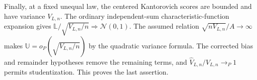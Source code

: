 Finally, at a fixed unequal law, the centered Kantorovich scores are bounded and have variance \(V_{L,n}\). The ordinary independent-sum characteristic-function expansion gives \(\mathbb L/\sqrt{V_{L,n}/n}\Rightarrow\mathcal N(0,1)\). The assumed relation \(\sqrt{nV_{L,n}}/A\to\infty\) makes \(\mathbb U=o_P(\sqrt{V_{L,n}/n})\) by the quadratic variance formula. The corrected bias and remainder hypotheses remove the remaining terms, and \(\widehat V_{L,n}/V_{L,n}\to_P1\) permits studentization. This proves the last assertion.